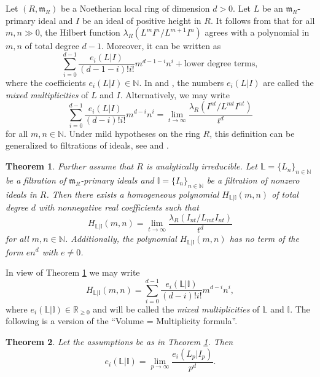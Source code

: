 \documentclass[12pt,a4paper]{amsart}
\theoremstyle{plain}
\newtheorem{theorem}{Theorem}[section]
\theoremstyle{definition}
\numberwithin{equation}{theorem}
\begin{document}
Let $(R,\mathfrak{m}_R)$ be a Noetherian local ring of dimension $d>0$. Let $L$ be an $\mathfrak{m}_R$-primary ideal and $I$ be an ideal of positive height in $R$. It follows from \cite{Bha57} that for all $m,n\gg 0$, the Hilbert function $\lambda_R \left(L^{m}I^{n}/L^{m+1}I^{n}\right)$ agrees with a polynomial in $m,n$ of total degree $d-1$. Moreover, it can be written as $$\sum_{i=0}^{d-1} \dfrac{e_i\left(L \vert I\right)}{(d-1-i)!i!}m^{d-1-i}n^i + \text{lower degree terms},$$ where the coefficients $e_i\left(L \vert I\right) \in \mathbb{N}$. In \cite{KV89} and \cite{Tru01}, the numbers $e_i\left(L \vert I\right)$ are called the \emph{mixed multiplicities} of $L$ and $I$. Alternatively, we may write
$$\sum_{i=0}^{d-1} \dfrac{e_i\left(L \vert I\right)}{(d-i)!i!}m^{d-i}n^i = \lim_{t\to\infty}\dfrac{\lambda_R\left(I^{nt}/L^{mt}I^{nt}\right)}{t^d}$$
for all $m,n\in\mathbb{N}$. Under mild hypotheses on the ring $R$, this definition can be generalized to filtrations of ideals, see \cite{CSS19} and \cite{CM22}.

\begin{theorem}\cite[Theorem 3.11]{CM22}\label{CM}
Further assume that $R$ is analytically irreducible. Let $\mathbb{L}=\{L_{n}\}_{n\in\mathbb{N}}$ be a filtration of $\mathfrak{m}_R$-primary ideals and $\mathbb{I}=\{I_{n}\}_{n\in\mathbb{N}}$ be a filtration of nonzero ideals in $R$. Then there exists a homogeneous polynomial $H_{\mathbb{L}\vert \mathbb{I}}(m,n)$ of total degree $d$ with nonnegative real coefficients such that $$H_{\mathbb{L}\vert \mathbb{I}}(m,n) = \lim_{t\to\infty}\dfrac{\lambda_R\left(I_{nt}/L_{mt}I_{nt}\right)}{t^d}$$ for all $m,n\in\mathbb{N}$. Additionally, the polynomial $H_{\mathbb{L}\vert \mathbb{I}}(m,n)$ has no term of the form $en^d$ with $e\neq 0$.
\end{theorem}

In view of Theorem \ref{CM} we may write $$H_{\mathbb{L}\vert \mathbb{I}}(m,n) = \sum_{i=0}^{d-1} \dfrac{e_i\left(\mathbb{L} \vert \mathbb{I}\right)}{(d-i)!i!}m^{d-i}n^i,$$ where $e_i\left(\mathbb{L} \vert \mathbb{I}\right) \in \mathbb{R}_{\geq 0}$ and will be called the \emph{mixed multiplicities} of $\mathbb{L}$ and $\mathbb{I}$. The following is a version of the ``Volume = Multiplicity formula''.

\begin{theorem}\cite[Corollary 3.13]{CM22}\label{vol=mult}
 Let the assumptions be as in Theorem \ref{CM}. Then $$e_i\left(\mathbb{L} \vert \mathbb{I}\right) = \lim_{p\to\infty}\dfrac{e_i\left(L_p \vert I_p\right)}{p^d}.$$
\end{theorem}
\end{document}
